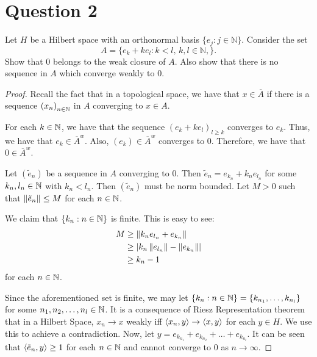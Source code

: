 \section{Question 2}
\horz
Let $H$ be a Hilbert space with an orthonormal basis $\{e_j: j\in \mathbb N\}.$ Consider the set $$A= \{e_k+ ke_l : k < l,\, k,l\in\mathbb N , \}.$$ Show that $0$ belongs to the weak closure of $A.$ Also show that there is no sequence in $A$ which converge weakly to $0.$
\horz

\begin{proof}
    Recall the fact that in a topological space, we have that $x \in \overline A$ if there is a sequence $\left( x_{n} \right)_{n \in \mathbb N}$ in $A$ converging to $x\in A$.
     
    For each $k \in \mathbb N$, we have that the sequence $\left( e_{k} + k e_{l} \right)_{l\ge k}$ converges to $e_{k}$. Thus, we have that $e_{k} \in \overline{A}^{w}$. Also, $\left( e_{k} \right) \in \overline{A}^{w}$ converges to $0$. Therefore, we have that $0 \in \overline{A}^{w}$. 

    Let $(\tilde{e}_n)$ be a sequence in $A$ converging to $0$. Then $\tilde{e}_{n} = e_{k_{n}} + k_{n} e_{l_{n}}$ for some $k_{n}, l_{n} \in \mathbb N$ with $k_{n}< l_{n}$. Then $\left( \tilde{e}_{n} \right)$ must be norm bounded. Let $M>0$ such that $\left\lVert \tilde{e}_{n} \right\rVert\le M$ for each $n\in \mathbb N$.

    We claim that $\left\{ k_{n} : n\in \mathbb N \right\}$ is finite. This is easy to see:
    \begin{align*}
	M &\ge \left\lVert k_n e_{l_n} + e_{k_n} \right\rVert \\
	&\ge \left\lvert k_n \left\lVert e_{l_n} \right\rVert - \left\lVert e_{k_n} \right\rVert \right\rvert \\
	&\ge k_{n}-1
    \end{align*}
    for each $n\in \mathbb N$.


    Since the aforementioned set is finite, we may let $\left\{ k_{n} : n \in \mathbb N \right\} = \left\{ k_{n_{1}}, \ldots , k_{n_{l}} \right\}$ for some $n_{1}, n_{2}, \ldots , n_{l} \in \mathbb N$.
    It is a consequence of Riesz Representation theorem that in a Hilbert Space, $x_{n} \to x$ weakly iff $\left\langle x_{n}, y \right\rangle \to \left\langle x,y \right\rangle$ for each $y\in H$. We use this to achieve a contradiction.
    Now, let $y=e_{k_{n_{1}}} + e_{k_{n_{2}}} + \ldots + e_{k_{n_{l}}}$. It can be seen that $\left\langle \tilde{e}_{n} , y \right\rangle \ge 1$ for each $n\in \mathbb N$ and cannot converge to $0$ as $n\to \infty$.
\end{proof}
